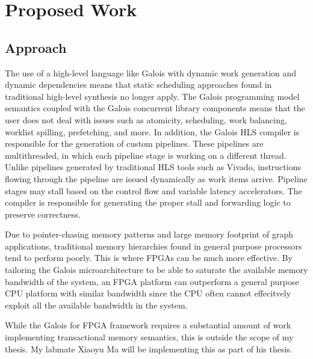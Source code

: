 %
\section{Proposed Work}\label{sect:proposedWork}


\subsection{Approach}

The use of a high-level language like Galois with dynamic work generation and dynamic dependencies means that 
static scheduling approaches found in traditional high-level synthesis no longer apply. The Galois programming model semantics coupled with the 
Galois concurrent library components means that the user does not deal with issues such as atomicity, 
scheduling, work balancing, worklist spilling, prefetching, and more. In addition, the Galois HLS compiler is responsible for the 
generation of custom pipelines. These pipelines are multithreaded, in which each pipeline stage is working 
on a different thread. Unlike pipelines generated by traditional HLS tools such as Vivado, instructions flowing 
through the pipeline are issued dynamically as work items arrive. Pipeline stages may stall based on the control 
flow and variable latency accelerators. The compiler is responsible for generating the proper stall and forwarding 
logic to preserve correctness.

Due to pointer-chasing memory patterns and large memory footprint of graph applications, traditional memory 
hierarchies found in general purpose processors tend to perform poorly. This is where FPGAs can be much more effective. 
By tailoring the Galois microarchitecture to be able to saturate the available memory bandwidth of the system, an FPGA 
platform can outperform a general purpose CPU platform with similar bandwidth since the CPU often cannot effecitvely 
exploit all the available bandwidth in the system.

While the Galois for FPGA framework requires a substantial amount of work implementing transactional memory semantics, 
this is outside the scope of my thesis. My labmate Xiaoyu Ma will be implementing this as part of his thesis.


